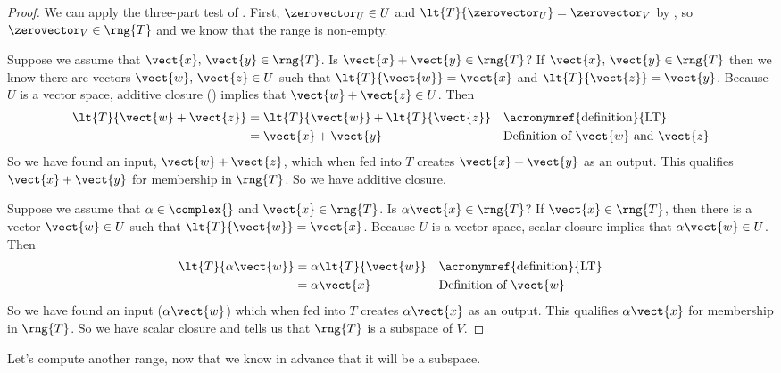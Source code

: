 \begin{proof}
We can apply the three-part test of .  First, $\zerovector_U\in U$ and $\lt{T}{\zerovector_U}=\zerovector_V$ by , so $\zerovector_V\in\rng{T}$ and we know that the range is non-empty.\par
%
Suppose we assume that $\vect{x},\,\vect{y}\in\rng{T}$.  Is $\vect{x}+\vect{y}\in\rng{T}$?  If $\vect{x},\,\vect{y}\in\rng{T}$ then we know there are vectors $\vect{w},\,\vect{z}\in U$ such that $\lt{T}{\vect{w}}=\vect{x}$ and $\lt{T}{\vect{z}}=\vect{y}$.  Because $U$ is a vector space, additive closure () implies that $\vect{w}+\vect{z}\in U$.  Then
%
\begin{align*}
\lt{T}{\vect{w}+\vect{z}}&=\lt{T}{\vect{w}}+\lt{T}{\vect{z}}&&\text{\acronymref{definition}{LT}}\\
&=\vect{x}+\vect{y}&&\text{Definition of $\vect{w}$ and $\vect{z}$}
\end{align*}
%
So we have found an input, $\vect{w}+\vect{z}$, which when fed into $T$ creates $\vect{x}+\vect{y}$ as an output.  This qualifies $\vect{x}+\vect{y}$ for membership in $\rng{T}$.  So we have additive closure.\par
%
Suppose we assume that $\alpha\in\complex{\null}$ and $\vect{x}\in\rng{T}$.  Is $\alpha\vect{x}\in\rng{T}$?  If $\vect{x}\in\rng{T}$, then there is a vector $\vect{w}\in U$ such that $\lt{T}{\vect{w}}=\vect{x}$.  Because $U$ is a vector space, scalar closure implies that $\alpha\vect{w}\in U$.  Then
%
\begin{align*}
\lt{T}{\alpha\vect{w}}&=\alpha\lt{T}{\vect{w}}&&\text{\acronymref{definition}{LT}}\\
&=\alpha\vect{x}&&\text{Definition of $\vect{w}$}
\end{align*}
%
So we have found an input ($\alpha\vect{w}$) which when fed into $T$ creates $\alpha\vect{x}$ as an output.  This qualifies $\alpha\vect{x}$ for membership in $\rng{T}$.  So we have scalar closure and  tells us that $\rng{T}$ is a subspace of $V$.\par
%
\end{proof}
%
Let's compute another range, now that we know in advance that it will be a subspace.
%
